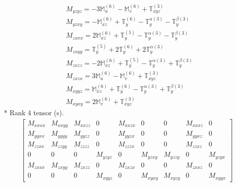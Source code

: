 \documentclass[fleqn,8pt,landscape]{jsarticle}
\begin{document}
\begin{align*}
& M_{yzyz} = - 3 \mathbb{M}_{u}^{(6)} - \mathbb{M}_{v}^{(6)} + \mathbb{T}_{xyz}^{(3)} \\
& M_{yzxy} = - \mathbb{M}_{xz}^{(6)} + \mathbb{T}_{y}^{(6)} - \mathbb{T}_{y}^{\alpha(3)} - \mathbb{T}_{y}^{\beta(3)} \\
& M_{zxxx} = 2 \mathbb{M}_{xz}^{(6)} + \mathbb{T}_{y}^{(5)} - \mathbb{T}_{y}^{\alpha(3)} - \mathbb{T}_{y}^{\beta(3)} \\
& M_{zxyy} = \mathbb{T}_{y}^{(5)} + 2 \mathbb{T}_{y}^{(6)} + 2 \mathbb{T}_{y}^{\alpha(3)} \\
& M_{zxzz} = - 2 \mathbb{M}_{xz}^{(6)} + \mathbb{T}_{y}^{(5)} - \mathbb{T}_{y}^{\alpha(3)} + \mathbb{T}_{y}^{\beta(3)} \\
& M_{zxzx} = 3 \mathbb{M}_{u}^{(6)} - \mathbb{M}_{v}^{(6)} + \mathbb{T}_{xyz}^{(3)} \\
& M_{xyyz} = \mathbb{M}_{xz}^{(6)} + \mathbb{T}_{y}^{(6)} - \mathbb{T}_{y}^{\alpha(3)} + \mathbb{T}_{y}^{\beta(3)} \\
& M_{xyxy} = 2 \mathbb{M}_{v}^{(6)} + \mathbb{T}_{xyz}^{(3)}
\end{align*}
* Rank 4 tensor (s).
\begin{align*}
\begin{bmatrix} M_{xxxx} & M_{xxyy} & M_{xxzz} & 0 & M_{xxzx} & 0 & 0 & M_{xxxz} & 0 \\ M_{yyxx} & M_{yyyy} & M_{yyzz} & 0 & M_{yyzx} & 0 & 0 & M_{yyxz} & 0 \\ M_{zzxx} & M_{zzyy} & M_{zzzz} & 0 & M_{zzzx} & 0 & 0 & M_{zzxz} & 0 \\ 0 & 0 & 0 & M_{yzyz} & 0 & M_{yzxy} & M_{yzzy} & 0 & M_{yzyx} \\ M_{zxxx} & M_{zxyy} & M_{zxzz} & 0 & M_{zxzx} & 0 & 0 & M_{zxxz} & 0 \\ 0 & 0 & 0 & M_{xyyz} & 0 & M_{xyxy} & M_{xyzy} & 0 & M_{xyyx} \end{bmatrix}
\end{align*}
\end{document}
